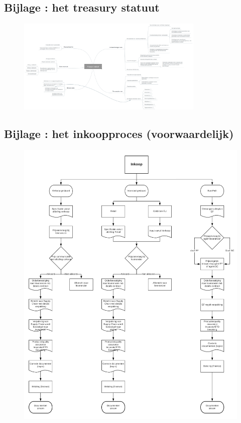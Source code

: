 \documentclass[10pt,a4paper,twoside]{report}
\newcounter{bijlage}[section] %
\begin{document}
\subsection*{\hypertarget{bij:treasury}{Bijlage \thebijlage}: het treasury statuut}
\begin{figure}[!h]
    \centering
    \includegraphics[angle=90,width=0.795\textwidth]{treasury}
    \label{fig:mmtreasury}
\end{figure}

\newpage
{}
\subsection*{\hypertarget{bij:inkoopproces}{Bijlage \thebijlage}: het inkoopproces (voorwaardelijk)}
\begin{figure}[!ht]
    \centering
    \includegraphics[width=1\textwidth]{inkoopproces}
    \label{fig:inkoopproces}
\end{figure}
\end{document}
